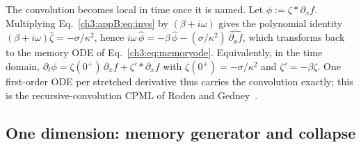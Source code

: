 The convolution becomes local in time once it is named.  Let
$\phi:=\zeta*\partial_x f$.  Multiplying Eq.~\eqref{ch3:appB:eq:invs} by
$(\beta+i\omega)$ gives the polynomial identity
$(\beta+i\omega)\hat\zeta=-\sigma/\kappa^{2}$, hence
$i\omega\,\hat\phi=-\beta\,\hat\phi
-(\sigma/\kappa^{2})\,\widehat{\partial_x f}$, which transforms back to
the memory ODE of Eq.~\eqref{ch3:eq:memoryode}.  Equivalently, in the time
domain,
$\partial_t\phi=\zeta(0^{+})\,\partial_x f+\zeta'*\partial_x f$ with
$\zeta(0^{+})=-\sigma/\kappa^{2}$ and $\zeta'=-\beta\zeta$.  One
first-order ODE per stretched derivative thus carries the convolution
exactly; this is the recursive-convolution CPML of Roden and
Gedney~\cite{roden2000cpml}.

\subsection{One dimension: memory generator and collapse}
\label{ch3:appB:1d}


